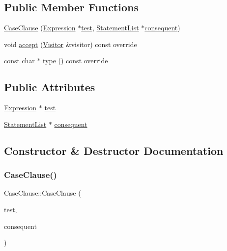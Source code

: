 \subsection*{Public Member Functions}
\begin{DoxyCompactItemize}
\item 
\hyperlink{struct_case_clause_a05d8bf165e3a4796247b5fbf1f71d3e5}{Case\+Clause} (\hyperlink{struct_expression}{Expression} $\ast$\hyperlink{struct_case_clause_a80b6f256f3d9910250e4b8433ea75d7f}{test}, \hyperlink{struct_statement_list}{Statement\+List} $\ast$\hyperlink{struct_case_clause_a3e6914411610d1893b61172521e11288}{consequent})
\item 
void \hyperlink{struct_case_clause_a5bbee9ea9ca206c09b8b79f8c96720a1}{accept} (\hyperlink{struct_visitor}{Visitor} \&visitor) const override
\item 
const char $\ast$ \hyperlink{struct_case_clause_a9dcb0a1a072df7d577b272c6bbb3c6dc}{type} () const override
\end{DoxyCompactItemize}
\subsection*{Public Attributes}
\begin{DoxyCompactItemize}
\item 
\hyperlink{struct_expression}{Expression} $\ast$ \hyperlink{struct_case_clause_a80b6f256f3d9910250e4b8433ea75d7f}{test}
\item 
\hyperlink{struct_statement_list}{Statement\+List} $\ast$ \hyperlink{struct_case_clause_a3e6914411610d1893b61172521e11288}{consequent}
\end{DoxyCompactItemize}


\subsection{Constructor \& Destructor Documentation}
\mbox{\label{struct_case_clause_a05d8bf165e3a4796247b5fbf1f71d3e5}} 
\subsubsection{\texorpdfstring{Case\+Clause()}{CaseClause()}}
{\footnotesize\ttfamily Case\+Clause\+::\+Case\+Clause (\begin{DoxyParamCaption}\item[{\hyperlink{struct_expression}{Expression} $\ast$}]{test,  }\item[{\hyperlink{struct_statement_list}{Statement\+List} $\ast$}]{consequent }\end{DoxyParamCaption})\hspace{0.3cm}{\ttfamily [inline]}}



